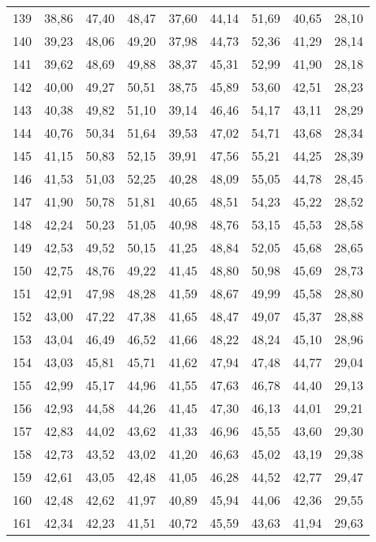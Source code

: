 \begin{longtable}{c c c c c c c c c}
      139& 	38,86& 	47,40& 	48,47& 	37,60& 	44,14& 	51,69& 	40,65& 	28,10 \\
      140& 	39,23& 	48,06& 	49,20& 	37,98& 	44,73& 	52,36& 	41,29& 	28,14 \\
      141& 	39,62& 	48,69& 	49,88& 	38,37& 	45,31& 	52,99& 	41,90& 	28,18 \\
      142& 	40,00& 	49,27& 	50,51& 	38,75& 	45,89& 	53,60& 	42,51& 	28,23 \\
      143& 	40,38& 	49,82& 	51,10& 	39,14& 	46,46& 	54,17& 	43,11& 	28,29 \\
      144& 	40,76& 	50,34& 	51,64& 	39,53& 	47,02& 	54,71& 	43,68& 	28,34 \\
      145& 	41,15& 	50,83& 	52,15& 	39,91& 	47,56& 	55,21& 	44,25& 	28,39 \\
      146& 	41,53& 	51,03& 	52,25& 	40,28& 	48,09& 	55,05& 	44,78& 	28,45 \\
      147& 	41,90& 	50,78& 	51,81& 	40,65& 	48,51& 	54,23& 	45,22& 	28,52 \\
      148& 	42,24& 	50,23& 	51,05& 	40,98& 	48,76& 	53,15& 	45,53& 	28,58 \\
      149& 	42,53& 	49,52& 	50,15& 	41,25& 	48,84& 	52,05& 	45,68& 	28,65 \\
      150& 	42,75& 	48,76& 	49,22& 	41,45& 	48,80& 	50,98& 	45,69& 	28,73 \\
      151& 	42,91& 	47,98& 	48,28& 	41,59& 	48,67& 	49,99& 	45,58& 	28,80 \\
      152& 	43,00& 	47,22& 	47,38& 	41,65& 	48,47& 	49,07& 	45,37& 	28,88 \\
      153& 	43,04& 	46,49& 	46,52& 	41,66& 	48,22& 	48,24& 	45,10& 	28,96 \\
      154& 	43,03& 	45,81& 	45,71& 	41,62& 	47,94& 	47,48& 	44,77& 	29,04 \\
      155& 	42,99& 	45,17& 	44,96& 	41,55& 	47,63& 	46,78& 	44,40& 	29,13 \\
      156& 	42,93& 	44,58& 	44,26& 	41,45& 	47,30& 	46,13& 	44,01& 	29,21 \\
      157& 	42,83& 	44,02& 	43,62& 	41,33& 	46,96& 	45,55& 	43,60& 	29,30 \\
      158& 	42,73& 	43,52& 	43,02& 	41,20& 	46,63& 	45,02& 	43,19& 	29,38 \\
      159& 	42,61& 	43,05& 	42,48& 	41,05& 	46,28& 	44,52& 	42,77& 	29,47 \\
      160& 	42,48& 	42,62& 	41,97& 	40,89& 	45,94& 	44,06& 	42,36& 	29,55 \\
      161& 	42,34& 	42,23& 	41,51& 	40,72& 	45,59& 	43,63& 	41,94& 	29,63 \\

\end{longtable}
